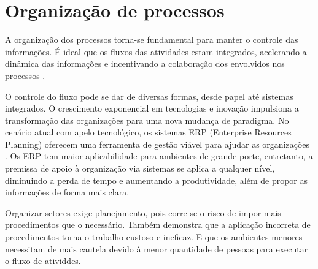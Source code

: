 \section{Organização de processos}\label{sec:process_organization}


A organização dos processos torna-se fundamental para manter o controle das informações. É ideal que os fluxos das atividades estam integrados, acelerando a dinâmica das informações e incentivando a colaboração dos envolvidos nos processos \cite{Berchet:2005:IDE:1195793.1672903}. 


O controle do fluxo pode se dar de diversas formas, desde papel até sistemas integrados. O crescimento exponencial em tecnologias e inovação impulsiona a transformação das organizações para uma nova mudança de paradigma. No cenário atual com apelo tecnológico, os sistemas ERP (Enterprise Resources Planning) oferecem uma ferramenta de gestão viável para ajudar as organizações \cite{Huin2004511}. Os ERP tem maior aplicabilidade para ambientes de grande porte, entretanto, a premissa de apoio à organização via sistemas se aplica a qualquer nível, diminuindo a perda de tempo e aumentando a produtividade, além de propor as informações de forma mais clara.


Organizar setores exige planejamento, pois corre-se o risco de impor mais procedimentos que o necessário. \cite{Huin2004511} Também demonstra que a aplicação incorreta de procedimentos torna o trabalho custoso e ineficaz. E que os ambientes menores necessitam de mais cautela devido à menor quantidade de pessoas para executar o fluxo de atividdes.






